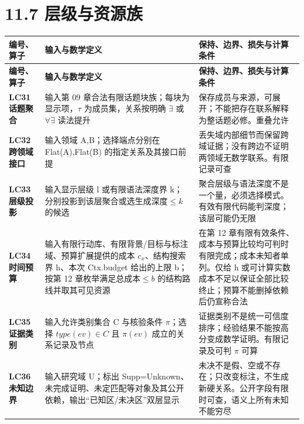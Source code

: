 \documentclass[UTF8,a4paper,zihao=-4,fontset=windows,openany]{ctexbook}
\def\mathrm#1{#1}%
\begin{document}
\section{11.7 层级与资源族}
\begingroup\small\setlength{\tabcolsep}{4pt}
\begin{longtable}{>{\raggedright\arraybackslash}p{}>{\raggedright\arraybackslash}p{}>{\raggedright\arraybackslash}p{}}
\toprule
\textbf{编号、算子} & \textbf{输入与数学定义} & \textbf{保持、边界、损失与计算条件} \\
\midrule
\endfirsthead
\toprule
\textbf{编号、算子} & \textbf{输入与数学定义} & \textbf{保持、边界、损失与计算条件} \\
\midrule
\endhead
\bottomrule
\endfoot
\bottomrule
\endlastfoot
\textbf{LC31 话题聚合} & 输入第 09 章合法有限话题块族；每块为显示项，\(\tau\) 为成员集，关系按明确 \(\exists\) 或 \(\forall\exists\) 读法提升 & 保存成员与来源，可展开；不能把存在联系解释为整话题必修。重叠允许 \\
\textbf{LC32 跨领域接口} & 输入领域 A,B；选择端点分别在 Flat(A),Flat(B) 的指定关系及其接口前提 & 丢失域内部细节而保留跨域证据；没有跨边不证明两领域无数学联系。有限记录可查 \\
\textbf{LC33 层级投影} & 输入显示层级 l 或有限语法深度界 k；分别投影到该层聚合或选生成深度\(\le k\) 的候选 & 聚合层级与语法深度不是一个量，必须选择模式。有效有限代码能判深度；该层可能仍无限 \\
\textbf{LC34 时间预算} & 输入有限行动库、有限背景/目标与标注域、预算扩展提供的成本 \(c_x\)、结构搜索界 h、本次 Ctx.budget 给出的上限 b；按第 12 章枚举满足总成本\(\le b\) 的结构路线并取其可见资源 & 在第 12 章有限有效条件、成本与预算比较均可判时有限完成；成本未知者单列。仅给 h 或可计算实数成本不足以保证全部比较终止；预算不能删掉依赖后仍宣称合法 \\
\textbf{LC35 证据类别} & 输入允许类别集合 C 与核验条件 \(\pi\)；选择 \(\mathrm{type}(\mathrm{ev})\in C\) 且 \(\pi(\mathrm{ev})\) 成立的关系记录及节点 & 证据类别不是统一可信度排序；经验结果不能按高分变成数学证明。有限记录及可判 \(\pi\) 可算 \\
\textbf{LC36 未知边界} & 输入研究域 U；标出 Supp=Unknown、未完成证明、未定匹配等对象及其公开依赖，输出“已知区/未决区”双层显示 & 未决不是假、空或不存在；只改变标注，不生成新硬关系。公开字段有限时可查，语义上所有未知不能穷尽 \\
\end{longtable}
\endgroup
\end{document}
